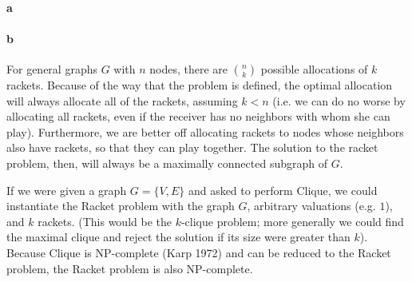 \begin{answer}{2}

% 

\paragraph{a} 


\paragraph{b} 


For general graphs $G$ with $n$ nodes, there are $n \choose k$ possible allocations of $k$ rackets. Because of the way that the problem is defined, the optimal allocation will always allocate all of the rackets, assuming $k<n$ (i.e. we can do no worse by allocating all rackets, even if the receiver has no neighbors with whom she can play). Furthermore, we are better off allocating rackets to nodes whose neighbors also have rackets, so that they can play together. The solution to the racket problem, then, will always be a maximally connected subgraph of $G$. 

If we were given a graph $G=\{V,E\}$ and asked to perform Clique, we could instantiate the Racket problem with the graph $G$, arbitrary valuations (e.g. $1$), and $k$ rackets. (This would be the $k$-clique problem; more generally we could find the maximal clique and reject the solution if its size were greater than $k$). Because Clique is NP-complete (Karp 1972) and can be reduced to the Racket problem, the Racket problem is also NP-complete. 


\end{answer}

